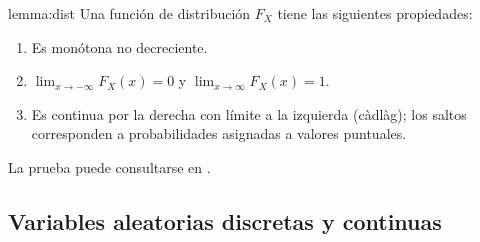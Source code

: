 \documentclass[../Main.tex]{subfiles}
\begin{document}
\begin{lemma}{}{lemma:dist}
Una función de distribución \(F_X\) tiene las siguientes propiedades:
\begin{enumerate}
    \item Es monótona no decreciente.
    \item \(\displaystyle \lim_{x\to-\infty}F_X(x)=0\) y
          \(\displaystyle \lim_{x\to\infty}F_X(x)=1\).
    \item Es continua por la derecha con límite a la izquierda (càdlàg); los saltos corresponden a
          probabilidades asignadas a valores puntuales.
\end{enumerate}
La prueba puede consultarse en \cite{grimmett2001probability}.
\end{lemma}


\subsection*{Variables aleatorias discretas y continuas}
\end{document}
